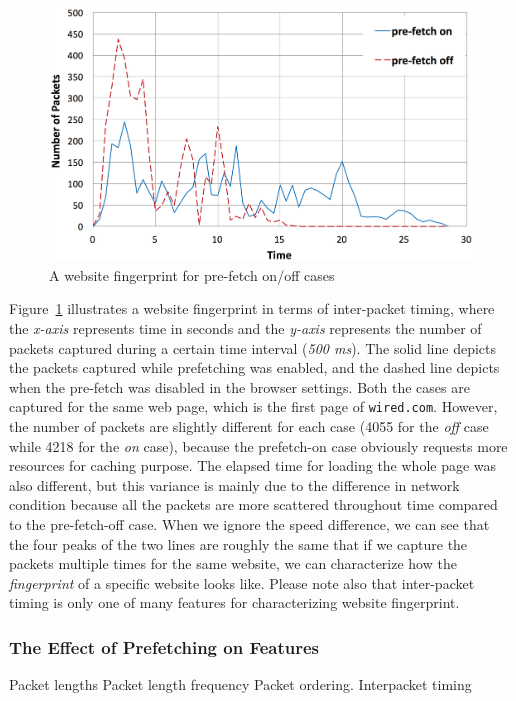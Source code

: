 \begin{figure}[h]
\includegraphics[width=0.95\columnwidth]{figures/prefetch.png}
\centering
\caption{A website fingerprint for pre-fetch on/off cases}
\label{fig:prefetch}
\end{figure}

Figure~\ref{fig:prefetch} illustrates a website fingerprint in terms of inter-packet timing, where the {\it x-axis} represents time in seconds and the {\it y-axis} represents the number of packets captured during a certain time interval ({\it 500 ms}).
The solid line depicts the packets captured while prefetching was enabled, and the dashed line depicts when the pre-fetch was disabled in the browser settings.
Both the cases are captured for the same web page, which is the first page of {\tt wired.com}.
However, the number of packets are slightly different for each case (4055 for the {\it off} case while 4218 for the {\it on} case), because the prefetch-on case obviously requests more resources for caching purpose. 
The elapsed time for loading the whole page was also different, but this variance is mainly due to the difference in network condition because all the packets are more scattered throughout time compared to the pre-fetch-off case.
When we ignore the speed difference, we can see that the four peaks of the two lines are roughly the same that if we capture the packets multiple times for the same website, we can characterize how the {\it fingerprint} of a specific website looks like.
Please note also that inter-packet timing is only one of many features for characterizing website fingerprint.


\subsubsection{The Effect of Prefetching on Features}


Packet lengths
Packet length frequency
Packet ordering.
Interpacket timing
